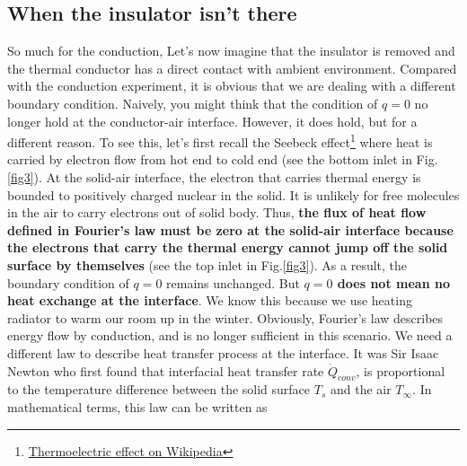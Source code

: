 \subsection{When the insulator isn't there}
\quad So much for the conduction, Let's now imagine that the insulator is removed and the thermal conductor has a direct contact with ambient environment. Compared with the conduction experiment, it is obvious that we are dealing with a different boundary condition. Naively, you might think that the condition of $q=0$ no longer hold at the conductor-air interface. However, it does hold, but for a different reason. To see this, let's first recall the Seebeck effect\footnote{\href{https://en.wikipedia.org/wiki/Thermoelectric_effect}{Thermoelectric effect on Wikipedia}} where heat is carried by electron flow from hot end to cold end (see the bottom inlet in Fig.\ref{fig3}). At the solid-air interface, the electron that carries thermal energy is bounded to positively charged nuclear in the solid. It is unlikely for free molecules in the air to carry electrons out of solid body. Thus, \textbf{the flux of heat flow defined in Fourier's law must be zero at the solid-air interface because the electrons that carry the thermal energy cannot jump off the solid surface by themselves} (see the top inlet in Fig.\ref{fig3}). As a result, the boundary condition of $q=0$ remains unchanged. But \textbf{$q=0$ does not mean no heat exchange at the interface}. We know this because we use heating radiator to warm our room up in the winter. Obviously, Fourier's law describes energy flow by conduction, and is no longer sufficient in this scenario. We need a different law to describe heat transfer process at the interface. It was Sir Isaac Newton who first found that interfacial heat transfer rate $\dot{Q}_{conv}$, is proportional to the temperature difference between the solid surface $T_s$ and the air $T_{\infty}$. In mathematical terms, this law can be written as

